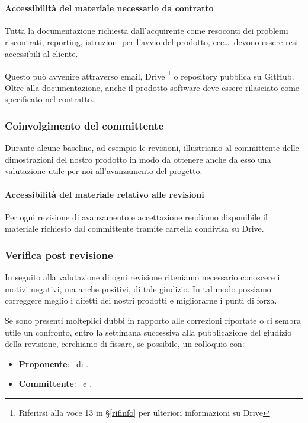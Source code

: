 		\paragraph{Accessibilità del materiale necessario da contratto} \label{AccessibilitaMateriale}
		Tutta la documentazione richiesta dall'acquirente come resoconti dei problemi riscontrati,  reporting, istruzioni per l'avvio del prodotto, ecc\dots\ devono essere resi accessibili al cliente. \par
		Questo può avvenire attraverso email, Drive \footnote{Riferirsi alla voce 13 in \S\ref{rifinfo} per ulteriori informazioni su Drive} o repository pubblica su GitHub.
		Oltre alla documentazione, anche il prodotto software deve essere rilasciato come specificato nel contratto.

		\subsubsection{Coinvolgimento del committente} \label{CoinvolgimentoCommittente}
		Durante alcune baseline, ad esempio le revisioni,
		illustriamo al committente delle dimostrazioni del nostro prodotto in modo da ottenere anche da esso una valutazione utile per noi all'avanzamento del progetto.

		\paragraph{Accessibilità del materiale relativo alle revisioni} \label{AccessibilitaMaterialeRevisioni}
		Per ogni revisione di avanzamento e accettazione rendiamo disponibile il materiale richiesto dal committente tramite cartella condivisa su Drive.

		\subsubsection{Verifica post revisione} \label{verificapostrevisione}
        In seguito alla valutazione di ogni revisione riteniamo necessario conoscere i motivi negativi, ma anche positivi, di tale giudizio. In tal modo possiamo correggere meglio i difetti dei nostri prodotti e migliorarne i punti di forza. \par
        Se sono presenti molteplici dubbi in rapporto alle correzioni riportate o ci sembra utile un confronto, entro la settimana successiva alla pubblicazione del giudizio della revisione, cerchiamo di fissare, se possibile, un colloquio con:
        \begin{itemize}
            \item \textbf{Proponente}: \DZ\ di \II.
            \item \textbf{Committente}: \TV\ e \RC.
		\end{itemize}


